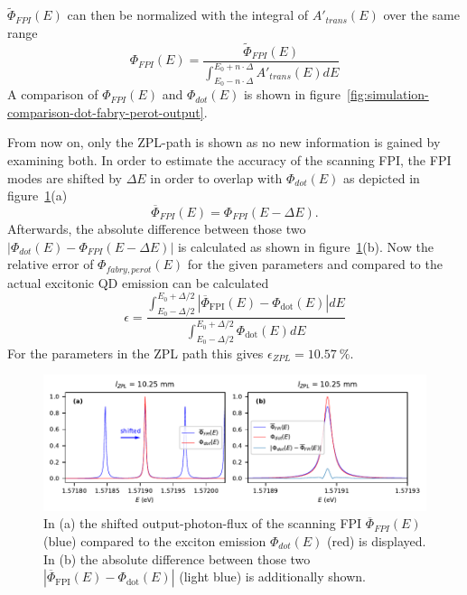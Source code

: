 $\tilde{\Phi}_{FPI}(E)$ can then be normalized with the integral of $A'_{trans}(E)$ over the same range
\begin{equation}
\Phi_{FPI}(E) =\frac{\tilde{\Phi}_{FPI}(E)}{\int^{E_0 + n \cdot \Delta}_{E_0 - n \cdot \Delta} A'_{trans}(E) dE}
\end{equation}
A comparison of $\Phi_{FPI}(E)$ and $\Phi_{dot}(E)$ is shown in figure~\ref{fig:simulation-comparison-dot-fabry-perot-output}.


From now on, only the \ac{ZPL}-path is shown as no new information is gained by examining both.
In order to estimate the accuracy of the scanning \ac{FPI}, the \ac{FPI} modes are shifted by $\Delta E$ in order to overlap with $\Phi_{dot}(E)$ as depicted in figure~\ref{fig:simulation-comparison-dot-fabry-perot-output-error}(a)
\begin{equation}
\overline{\Phi}_{FPI}(E) = \Phi_{FPI}(E - \Delta E).
\end{equation}
Afterwards, the absolute difference between those two $|\Phi_{dot}(E) - \Phi_{FPI}(E-\Delta E)|$ is calculated as shown in figure~\ref{fig:simulation-comparison-dot-fabry-perot-output-error}(b).
Now the relative error of  $\Phi_{fabry,perot}(E)$  for the given parameters and compared to the actual excitonic \ac{QD} emission  can be calculated
\begin{equation}
\epsilon = \frac{\int^{E_0 + \Delta / 2}_{E_0 - \Delta / 2} \left|\overline{\Phi}_{\text{FPI}}(E) - \Phi_{\text{dot}}(E)\right| dE }{\int^{E_0 + \Delta / 2}_{E_0 - \Delta / 2} \Phi_{\text{dot}}(E) dE}
\end{equation}
For the parameters in the \ac{ZPL} path this gives $\epsilon_{ZPL}=\SI{10.57}{\percent}$.


\begin{figure}[H]
	\centering
	\includegraphics[width=\linewidth]{figures/fabry-perot/plots/simulation-comparison-dot-fabry-perot-output-error}
	\caption{In (a) the shifted output-photon-flux of the scanning FPI $\overline{\Phi}_{FPI}(E)$ (blue) compared to the exciton emission $\Phi_{dot}(E)$ (red) is displayed.
	In (b) the absolute difference between those two $ \left|\overline{\Phi}_{\text{FPI}}(E) - \Phi_{\text{dot}}(E)\right|$ (light blue) is additionally shown.}
	\label{fig:simulation-comparison-dot-fabry-perot-output-error}
\end{figure}


